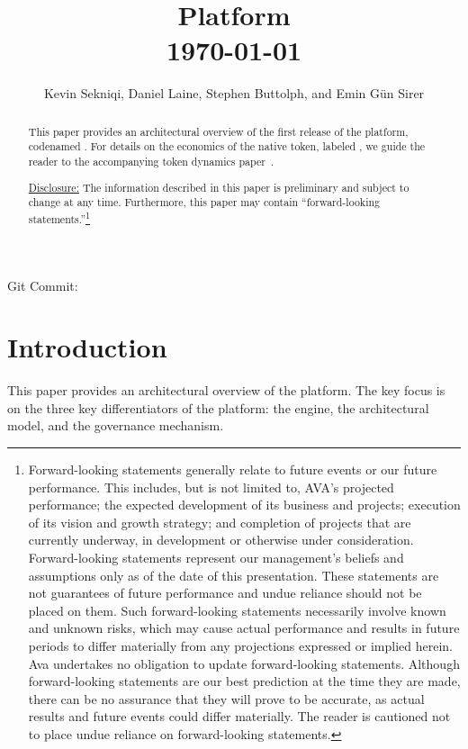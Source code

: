 \documentclass[runningheads]{llncs}
\begin{document}
\immediate{}

\title{\AVAPlatformName{} Platform\\\today}
\author{Kevin Sekniqi, Daniel Laine, Stephen Buttolph, and Emin G{\"u}n Sirer}
\institute{}

\maketitle

\begin{abstract}
This paper provides an architectural overview of the first release of the \AVAPlatformName{} platform, codenamed \AVAPlatformNameFirstRelease{}. For details on the economics of the native token, labeled \AVATokenName{}, we guide the reader to the accompanying token dynamics paper~\cite{avatokenpaper}.

\underline{Disclosure:} The information described in this paper is preliminary and subject to change at any time. Furthermore, this paper may contain “forward-looking statements.”\footnote{Forward-looking statements generally relate to future events or our future performance. This includes, but is not limited to, AVA’s projected performance; the expected development of its business and projects; execution of its vision and growth strategy; and completion of projects that are currently underway, in development or otherwise under consideration. Forward-looking statements represent our management’s beliefs and assumptions only as of the date of this presentation.
These statements are not guarantees of future performance and undue reliance should not be placed on them. Such forward-looking statements necessarily involve known and unknown risks, which may cause actual performance and results in future periods to differ materially from any projections expressed or implied herein. Ava undertakes no obligation to update forward-looking statements.
Although forward-looking statements are our best prediction at the time they are made, there can be no assurance that they will prove to be accurate, as actual results and future events could differ materially. The reader is cautioned not to place undue reliance on forward-looking statements.}

\end{abstract}
\begin{center} 
    \scriptsize Git Commit: 
 \end{center}
\section{Introduction}
\label{section:introduction}
This paper provides an architectural overview of the \AVAPlatformName{} platform. The key focus is on the three key differentiators of the platform: the engine, the architectural model, and the governance mechanism. 
\end{document}
